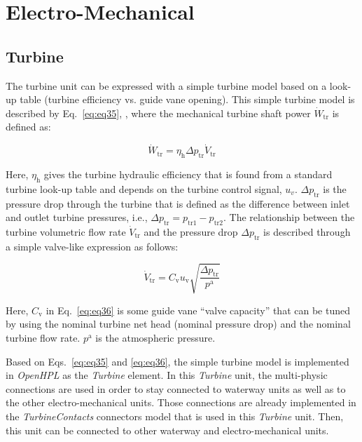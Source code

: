\documentclass[%
]{USN-PhD}
\begin{document}
\section{Electro-Mechanical}

\subsection{Turbine}

The turbine unit can be expressed with a simple turbine model based on a look-up table (turbine efficiency vs. guide vane opening). This simple turbine model is described by Eq.~\ref{eq:eq35}, \cite{LieL:18,Vyt:19b}, where the mechanical turbine shaft power $\dot{W}_\mathrm{tr}$ is defined as:

\begin{equation}\label{eq:eq35}
\dot{W}_\mathrm{tr} = \eta_\mathrm{h}\Delta p_\mathrm{tr}\dot{V}_\mathrm{tr}
\end{equation}

Here, $\eta_\mathrm{h}$ gives the turbine hydraulic efficiency that is found from a standard turbine look-up table and depends on the turbine control signal, $u_v$. $\Delta p_\mathrm{tr}$ is the pressure drop through the turbine that is defined as the difference between inlet and outlet turbine pressures, i.e., $\Delta p_\mathrm{tr} = p_\mathrm{tr1}-p_\mathrm{tr2}$. The relationship between the turbine volumetric flow rate $\dot{V}_\mathrm{tr}$ and the pressure drop $\Delta p_\mathrm{tr}$ is described through a simple valve-like expression as follows:

\begin{equation}\label{eq:eq36}
\dot{V}_\mathrm{tr} = C_\mathrm{v} u_\mathrm{v} \sqrt{\frac{\Delta p_\mathrm{tr}}{p^\mathrm{a}}}
\end{equation}

Here, $C_\mathrm{v}$ in Eq.~\ref{eq:eq36} is some guide vane ``valve capacity'' that can be tuned by using the nominal turbine net head (nominal pressure drop) and the nominal turbine flow rate. $p^\mathrm{a}$ is the atmospheric pressure.

Based on Eqs.~\ref{eq:eq35} and \ref{eq:eq36}, the simple turbine model is implemented in \emph{OpenHPL} as the \emph{Turbine} element.  In this \emph{Turbine} unit, the multi-physic connections are used in order to stay connected to waterway units as well as to the other electro-mechanical units. Those connections are already implemented in the \emph{TurbineContacts} connectors model that is used in this \emph{Turbine} unit. Then, this unit can be connected to other waterway and electro-mechanical units.
\end{document}
